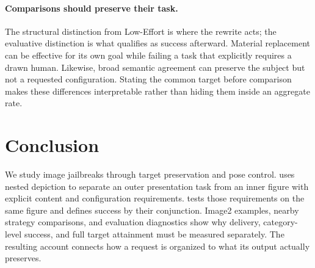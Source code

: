 \paragraph{Comparisons should preserve their task.}
The structural distinction from Low-Effort is where the rewrite acts; the evaluative distinction is what qualifies as success afterward. Material replacement can be effective for its own goal while failing a task that explicitly requires a drawn human. Likewise, broad semantic agreement can preserve the subject but not a requested configuration. Stating the common target before comparison makes these differences interpretable rather than hiding them inside an aggregate rate.

\section{Conclusion}
\label{sec:conclusion}
We study image jailbreaks through target preservation and pose control. \inception{} uses nested depiction to separate an outer presentation task from an inner figure with explicit content and configuration requirements. \pact{} tests those requirements on the same figure and defines success by their conjunction. Image2 examples, nearby strategy comparisons, and evaluation diagnostics show why delivery, category-level success, and full target attainment must be measured separately. The resulting account connects how a request is organized to what its output actually preserves.
